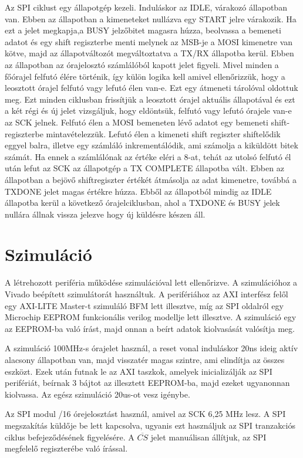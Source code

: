\documentclass[a4paper,11pt]{article}
\begin{document}
Az SPI ciklust egy állapotgép kezeli. Induláskor az IDLE, várakozó állapotban van. Ebben az állapotban a kimeneteket nullázva egy START jelre várakozik. Ha ezt a jelet megkapja,a BUSY jelzőbitet magasra húzza, beolvassa a bemeneti adatot és egy shift regiszterbe menti melynek az MSB-je a MOSI kimenetre van kötve, majd az állapotváltozót megváltoztatva a TX/RX állapotba kerül. Ebben az állapotban az órajelosztó számlálóból kapott jelet figyeli. Mivel minden a főórajel felfutó élére történik, így külön logika kell amivel ellenőrizzük, hogy a leosztott órajel felfutó vagy lefutó élen van-e. Ezt egy átmeneti tárolóval oldottuk meg. Ezt minden ciklusban frissítjük a leosztott órajel aktuális állapotával és ezt a két régi és új jelet vizsgáljuk, hogy eldöntsük, felfutó vagy lefutó órajele van-e az SCK jelnek. Felfutó élen a MOSI bemeneten lévő adatot egy bemeneti shift-regiszterbe mintavételezzük. Lefutó élen a kimeneti shift regiszter shiftelődik eggyel balra, illetve egy számláló inkrementálódik, ami számolja a kiküldött bitek számát. Ha ennek a számlálónak az értéke eléri a 8-at, tehát az utolsó felfutó él után lefut az SCK az állapotgép a TX COMPLETE állapotba vált. Ebben az állapotban a bejövő shiftregiszter értékét átmásolja az adat kimenetre, továbbá a TXDONE jelet magas értékre húzza. Ebből az állapotból mindig az IDLE állapotba kerül a következő órajelciklusban, ahol a TXDONE és BUSY jelek nullára állnak vissza jelezve hogy új küldésre készen áll.

\section{Szimuláció}
A létrehozott periféria működése szimulációval lett ellenőrizve. A szimulációhoz a Vivado beépített szimulátorát használtuk. A perifériához az AXI interfész felől egy AXI-LITE Master-t szimuláló BFM lett illesztve, míg az SPI oldalról egy Microchip EEPROM funkcionális verilog modellje lett illesztve. A szimuláció egy az EEPROM-ba való írást, majd onnan a beírt adatok kiolvasását valósítja meg.

A szimuláció 100MHz-s órajelet használ, a reset vonal induláskor 20ns ideig aktív alacsony állapotban van, majd visszatér magas szintre, ami elindítja az összes eszközt. Ezek után futnak le az AXI taszkok, amelyek inicializálják az SPI perifériát, beírnak 3 bájtot az illesztett EEPROM-ba, majd ezeket ugyanonnan kiolvassa. Az egész szimuláció 20us-ot vesz igénybe.

Az SPI modul /16 órejelosztást használ, amivel az SCK 6,25 MHz lesz. A SPI megszakítás küldője be lett kapcsolva, ugyanis ezt használjuk az SPI tranzakciós ciklus befejeződésének figyelésére. A $\overline{CS}$ jelet manuálisan állítjuk, az SPI megfelelő regiszterébe való írással.
\end{document}
